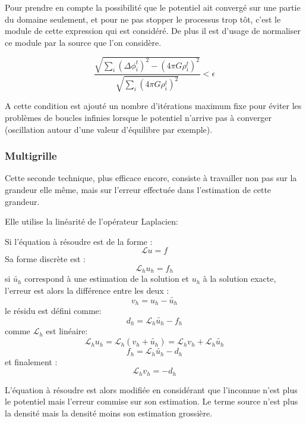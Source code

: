 Pour prendre en compte la possibilité que le potentiel ait convergé sur une partie du domaine seulement, et pour ne pas stopper le processus trop tôt, c'est le module de cette expression qui est considéré. De plus il est d'usage de normaliser ce module par la source que l'on considère.

\[\dfrac{ \sqrt{  \sum_i \left (  \Delta \phi_i^t \right )^2 - \left (4 \pi G \rho^t_i  \right )^2 } }{\sqrt{  \sum_i  \left (4 \pi G \rho^t_i  \right )^2 } } < \epsilon \]

A cette condition est ajouté un nombre d'itérations maximum fixe pour éviter les problèmes de boucles infinies lorsque le potentiel n'arrive pas à converger (oscillation autour d'une valeur d'équilibre par exemple).

\subsubsection{Multigrille}
Cette seconde technique, plus efficace encore, consiste à travailler non pas sur la grandeur elle même, mais sur l'erreur effectuée dans l'estimation de cette grandeur.

Elle utilise la linéarité de l'opérateur Laplacien: 
 
Si l'équation à résoudre est de la forme : 
\[ \mathcal{L} u = f \]
Sa forme discrète est :
\[ \mathcal{L}_h u_h = f_h \]
si $\tilde{u_h}$ correspond à une estimation de la solution et $u_h$ à la solution exacte, l'erreur est alors la différence entre les deux : 
\[ v_h = u_h - \tilde{u_h} \]
le résidu est défini comme:
\[ d_h = \mathcal{L}_h \tilde{u_h} - f_h \]
comme $\mathcal{L}_h$ est linéaire:
\[ \mathcal{L}_h u_h = \mathcal{L}_h (v_h + \tilde{u_h} ) = \mathcal{L}_h v_h +\mathcal{L}_h \tilde{u_h} \]
\[ f_h   = \mathcal{L}_h \tilde{u_h} - d_h\]
et finalement :
\[ \mathcal{L}_h v_h = -d_h \]

L'équation à résoudre est alors modifiée en considérant que l'inconnue n'est plus le potentiel mais l'erreur commise sur son estimation. Le terme source n'est plus la densité mais la densité moins son estimation grossière.\\


